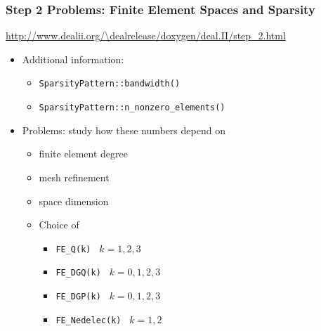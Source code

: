 \begin{frame}
  \frametitle{Step 2 Problems: Finite Element Spaces and Sparsity}
  {\footnotesize{\url{http://www.dealii.org/\dealrelease/doxygen/deal.II/step_2.html}}}
  \begin{itemize}
  \item Additional information:
    \begin{itemize}
    \item \texttt{SparsityPattern::bandwidth()}
    \item \texttt{SparsityPattern::n\_nonzero\_elements()}
    \end{itemize}
  \item Problems: study how these numbers depend on
    \begin{itemize}
    \item finite element degree
    \item mesh refinement
    \item space dimension
    \item Choice of
      \begin{itemize}
      \item \lstinline!FE_Q(k) ! $k=1,2,3$
      \item \lstinline!FE_DGQ(k) ! $k=0,1,2,3$
      \item \lstinline!FE_DGP(k) ! $k=0,1,2,3$
      \item \lstinline!FE_Nedelec(k) ! $k=1,2$
      \end{itemize}
    \end{itemize}
  \end{itemize}
\end{frame}
